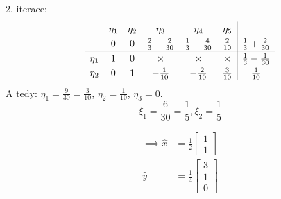 \begin{multicols}{2}
    2. iterace:
    \[
    {
        \renewcommand{\arraystretch}{1.25}
        \begin{array}{cccccc|c}
            &\eta_1 & \eta_2 & \eta_3 & \eta_4 & \eta_5 & \\
            &0 & 0 & \frac{2}{3} - \frac{2}{30}& \frac{1}{3}-\frac{4}{30} & \frac{2}{10} & \frac{1}{3}+\frac{2}{30} \\ \hline
            \eta_1 &1  &0  & \times & \times & \times & \frac{1}{3}-\frac{1}{30} \\
            \eta_2 &0  & 1  & -\frac{1}{10} & -\frac{2}{10} & \frac{3}{10} & \frac{1}{10}  \\
        \end{array}
    }
    \]
    A tedy: $\eta_1 = \frac{9}{30} = \frac{3}{10}$, $\eta_2 = \frac{1}{10}$, $\eta_3 = 0$.
    \[\xi_1 = \frac{6}{30} = \frac{1}{5}, \xi_2 = \frac{1}{5}\]

\columnbreak

    \begin{align*}
        \implies \hat x &= \frac{1}{2}\begin{bmatrix} 1 \\ 1\end{bmatrix} \\
        \hat y &= \frac{1}{4}\begin{bmatrix} 3 \\ 1 \\ 0\end{bmatrix}
    \end{align*}

\end{multicols}
